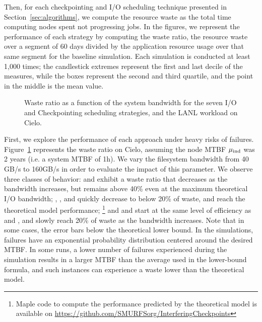 Then, for each checkpointing and I/O scheduling technique presented in
Section~\ref{sec:algorithms}, we compute the resource waste as the
total time computing nodes spent not progressing jobs. In the
figures, we represent the performance of each strategy by computing
the waste ratio, \ie the resource waste over a segment of 60 days
divided by the application resource usage over that same segment for
the baseline simulation. Each simulation is conducted at least 1,000
times; the candlestick extremes represent the first and last decile of
the measures, while the boxes represent the second and third quartile,
and the point in the middle is the mean value.

\begin{figure}
  \begin{center}
    \resizebox{\linewidth}{!}{}
  \end{center}
  \caption{Waste ratio as a function of the system bandwidth for the
    seven I/O and Checkpointing scheduling strategies, and the LANL workload on
    Cielo. \label{fig:cielo-1hmtbf}}
\end{figure}

First, we explore the performance of each approach under heavy risks
of failures. Figure~\ref{fig:cielo-1hmtbf} represents the waste ratio
on Cielo, assuming the node MTBF $\mu_{\text{ind}}$ was 2 years (i.e. a system
MTBF of 1h). We vary the filesystem bandwidth from 40 GB/s to 160GB/s
in order to evaluate the impact of this parameter. We observe three
classes of behavior: \propfixed and \bfifofixed exhibit a waste ratio
that decreases as the bandwidth increases, but remains above 40\% even
at the maximum theoretical I/O bandwidth; \fifodaly, \fifofixed, and
\cooperative quickly decrease to below 20\% of waste, and reach
the theoretical model performance;
%
\footnote{Maple code to compute the
  performance predicted by the theoretical model is available on
  \url{https://github.com/SMURFSorg/InterferingCheckpoints}}
%
and \propdaly and \bfifodaly start at the same level of efficiency as
\propfixed and \bfifofixed, and slowly reach 20\% of waste as the bandwidth
increases.
%
Note that in some cases, the error bars below the theoretical
lower bound. In the simulations, failures have an exponential probability
distribution centered around the desired MTBF. In some runs, a lower
number of failures experienced during the simulation results in a larger
MTBF than the average used in the lower-bound formula, and such instances
can experience a waste lower than the theoretical model.

